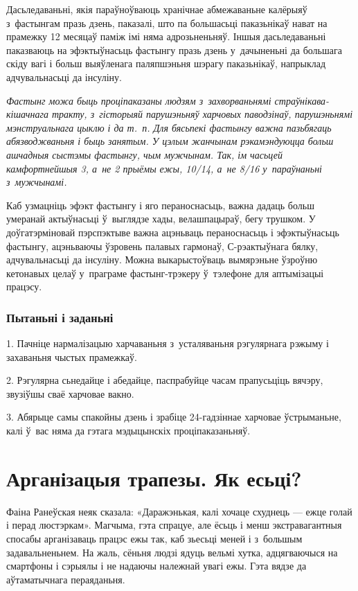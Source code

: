 Дасьледаваньні, якія параўноўваюць хранічнае абмежаваньне калёрыяў з~фастынгам празь дзень, паказалі, што па большасьці паказьнікаў нават на прамежку 12 месяцаў паміж імі няма адрозьненьняў. Іншыя дасьледаваньні паказваюць на эфэктыўнасьць фастынгу празь дзень у~дачыненьні да большага скіду вагі і больш выяўленага паляпшэньня шэрагу паказьнікаў, напрыклад адчувальнасьці да інсуліну.

\emph{Фастынг можа быць проціпаказаны людзям з~захворваньнямі страўнікава-кішачнага тракту, з~гісторыяй парушэньняў харчовых паводзінаў, парушэньнямі мэнструальнага цыклю і да т.~п. Для бясьпекі фастынгу важна пазьбягаць абязводжваньня і быць занятым. У цэлым жанчынам рэкамэндуюцца больш ашчадныя сыстэмы фастынгу, чым мужчынам. Так, ім часьцей камфортнейшыя 3, а~не 2 прыёмы ежы, 10/14, а~не 8/16 у~параўнаньні з~мужчынамі.}

Каб узмацніць эфэкт фастынгу і яго пераноснасьць, важна дадаць больш умеранай актыўнасьці ў~выглядзе хады, велашпацыраў, бегу трушком. У доўгатэрміновай пэрспэктыве важна ацэньваць пераноснасьць і эфэктыўнасьць фастынгу, ацэньваючы ўзровень палавых гармонаў, С-рэактыўнага бялку, адчувальнасьці да інсуліну. Можна выкарыстоўваць вымярэньне ўзроўню кетонавых целаў у~праграме фастынг-трэкеру ў~тэлефоне для аптымізацыі працэсу.

\subsubsection{Пытаньні і заданьні}

1. Пачніце нармалізацыю харчаваньня з~усталяваньня рэгулярнага рэжыму і захаваньня чыстых прамежкаў.

2. Рэгулярна сьнедайце і абедайце, паспрабуйце часам прапусьціць вячэру, звузіўшы сваё харчовае вакно.

3. Абярыце самы спакойны дзень і зрабіце 24-гадзіннае харчовае ўстрыманьне, калі ў~вас няма да гэтага мэдыцынскіх проціпаказаньняў.


\section{Арганізацыя трапезы. Як есьці?}

Фаіна Ранеўская неяк сказала: «Даражэнькая, калі хочаце схуднець — ежце голай і перад люстэркам». Магчыма, гэта спрацуе, але ёсьць і менш экстравагантныя спосабы арганізаваць працэс ежы так, каб зьесьці меней і з~большым задавальненьнем. На жаль, сёньня людзі ядуць вельмі хутка, адцягваючыся на смартфоны і сэрыялы і не надаючы належнай увагі ежы. Гэта вядзе да аўтаматычнага пераяданьня.

